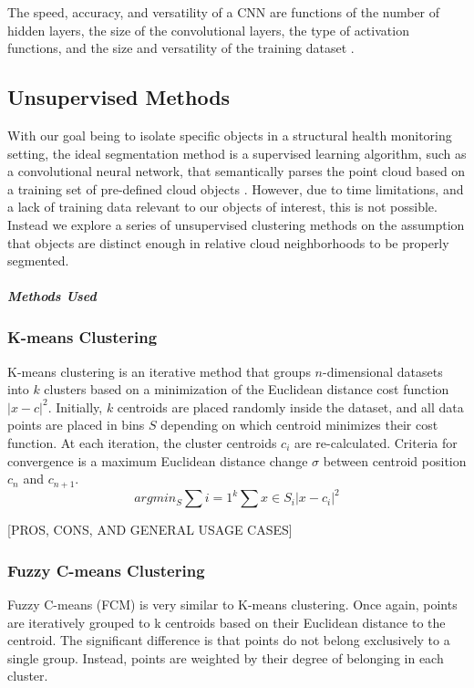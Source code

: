 \documentclass[12pt]{drexelthesis}
\let\Oldsubsection\subsection
\renewcommand{\subsection}{\FloatBarrier\Oldsubsection}
\let\Oldsubsubsection\subsubsection
\renewcommand{\subsubsection}{\FloatBarrier\Oldsubsubsection}
\begin{document}
The speed, accuracy, and versatility of a CNN are functions of the number of hidden layers, the size of the convolutional layers, the type of activation functions, and the size and versatility of the training dataset \cite{RN7}.

\subsection{Unsupervised Methods}
With our goal being to isolate specific objects in a structural health monitoring setting, the ideal segmentation method is a supervised learning algorithm, such as a convolutional neural network, that semantically parses the point cloud based on a training set of pre-defined cloud objects \cite{RN72}. However, due to time limitations, and a lack of training data relevant to our objects of interest, this is not possible. Instead we explore a series of unsupervised clustering methods on the assumption that objects are distinct enough in relative cloud neighborhoods to be properly segmented.
\subparagraph{Methods Used}
\subsubsection{K-means Clustering}
K-means clustering is an iterative method that groups $n$-dimensional datasets into $k$ clusters based on a minimization of the Euclidean distance cost function $|x-c|^{2}$. Initially, $k$ centroids are placed randomly inside the dataset, and all data points are placed in bins $S$ depending on which centroid minimizes their cost function. At each iteration, the cluster centroids $c_{i}$ are re-calculated. Criteria for convergence is a maximum Euclidean distance change $\sigma$ between centroid position $c_{n}$ and $c_{n+1}$.
\begin{equation}
	arg min_{S} \sum{i=1}^{k} \sum{x \in S_{i}} |x - c_{i}|^{2}
\end{equation}

[PROS, CONS, AND GENERAL USAGE CASES]

\subsubsection{Fuzzy C-means Clustering}

Fuzzy C-means (FCM) is very similar to K-means clustering. Once again, points are iteratively grouped to k centroids based on their Euclidean distance to the centroid. The significant difference is that points do not belong exclusively to a single group. Instead, points are weighted by their degree of belonging in each cluster.
\end{document}
